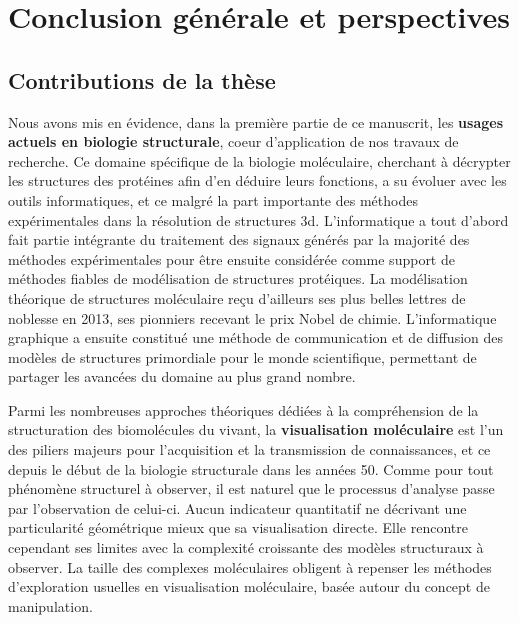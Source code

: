 


\chapter*{Conclusion générale et perspectives}
\mtcaddchapter

\mtcaddpart



\section*{Contributions de la thèse}

Nous avons mis en évidence, dans la première partie de ce manuscrit, les \textbf{usages actuels en biologie structurale}, coeur d'application de nos travaux de recherche. Ce domaine spécifique de la biologie moléculaire, cherchant à décrypter les structures des protéines afin d'en déduire leurs fonctions, a su évoluer avec les outils informatiques, et ce malgré la part importante des méthodes expérimentales dans la résolution de structures 3d. 
L'informatique a tout d'abord fait partie intégrante du traitement des signaux générés par la majorité des méthodes expérimentales pour être ensuite considérée comme support de méthodes fiables de modélisation de structures protéiques. La modélisation théorique de structures moléculaire reçu d'ailleurs ses plus belles lettres de noblesse en 2013, ses pionniers recevant le prix Nobel de chimie. L'informatique graphique a ensuite constitué une méthode de communication et de diffusion des modèles de structures primordiale pour le monde scientifique, permettant de partager les avancées du domaine au plus grand nombre.

Parmi les nombreuses approches théoriques dédiées à la compréhension de la structuration des biomolécules du vivant, la \textbf{visualisation moléculaire} est l'un des piliers majeurs pour l'acquisition et la transmission de connaissances, et ce depuis le début de la biologie structurale dans les années 50. Comme pour tout phénomène structurel à observer, il est naturel que le processus d'analyse passe par l'observation de celui-ci. Aucun indicateur quantitatif ne décrivant une particularité géométrique mieux que sa visualisation directe. Elle rencontre cependant ses limites avec la complexité croissante des modèles structuraux à observer. La taille des complexes moléculaires obligent à repenser les méthodes d'exploration usuelles en visualisation moléculaire, basée autour du concept de manipulation.



